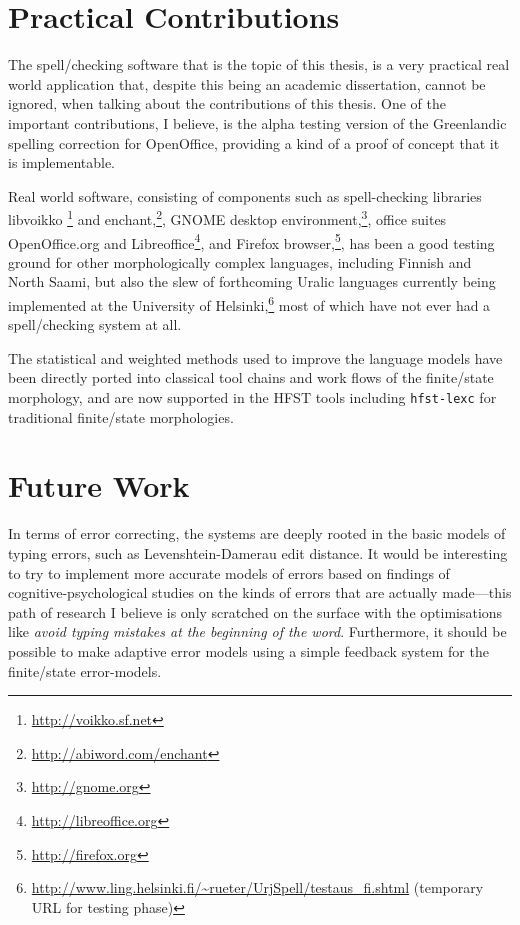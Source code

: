\documentclass[officiallayout]{unihelcompling}
\begin{document}
\section{Practical Contributions}
\label{sec:practical-contributions}

The spell\-/checking software that is the topic of this thesis, is a very
practical real world application that, despite this being an academic
dissertation, cannot be ignored, when talking about the contributions of this
thesis. One of the important contributions, I believe, is the alpha testing
version of the Greenlandic spelling correction for OpenOffice, providing a kind
of a proof of concept that it is implementable.

Real world software, consisting of components such as spell-checking libraries libvoikko \footnote{\url{http://voikko.sf.net}} and enchant,\footnote{\url{http://abiword.com/enchant}}, GNOME
desktop environment,\footnote{\url{http://gnome.org}}, office suites OpenOffice.org and Libreoffice\footnote{\url{http://libreoffice.org}}, and Firefox browser,\footnote{\url{http://firefox.org}}, has 
been a good testing ground for other morphologically complex languages,
including Finnish and North Saami, but also the slew of forthcoming Uralic
languages currently being implemented at the University of
Helsinki,\footnote{\url{http://www.ling.helsinki.fi/~rueter/UrjSpell/testaus_fi.shtml}
(temporary URL for testing phase)} most of which have not ever had a
spell\-/checking system at all. 

The statistical and weighted methods used to improve the language models have
been directly ported into classical tool chains and work flows of the 
finite\-/state morphology, and are now supported in the HFST tools including
\texttt{hfst-lexc} for traditional finite\-/state morphologies.

\section{Future Work}
\label{sec:future-work}

In terms of error correcting, the systems are deeply rooted in the basic models
of typing errors, such as Levenshtein-Damerau edit distance. It would be
interesting to try to implement more accurate models of errors based on
findings of cognitive-psychological studies on the kinds of errors that are
actually made---this path of research I believe is only scratched on the
surface with the optimisations like \emph{avoid typing mistakes at the
beginning of the word}. Furthermore, it should be possible to make adaptive
error models using a simple feedback system for the finite\-/state
error-models.
\end{document}
